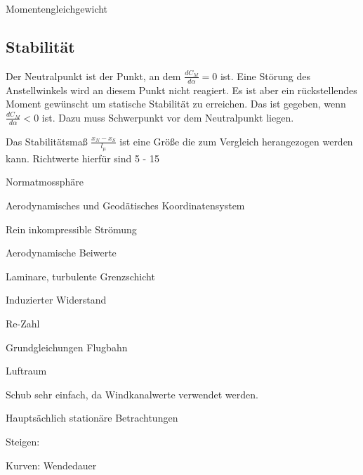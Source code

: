 Momentengleichgewicht

\subsection{Stabilität}
\label{stabilität}

Der Neutralpunkt ist der Punkt, an dem $\frac{dC_M}{d\alpha} = 0$ ist. Eine Störung des Anstellwinkels wird an diesem Punkt nicht reagiert. Es ist aber ein rückstellendes Moment gewünscht um statische Stabilität zu erreichen. Das ist gegeben, wenn $\frac{dC_M}{d\alpha} < 0$ ist. Dazu muss Schwerpunkt vor dem Neutralpunkt liegen.

Das Stabilitätsmaß $\frac{x_N - x_S}{l_\mu}$ ist eine Größe die zum Vergleich herangezogen werden kann. Richtwerte hierfür sind 5 - 15%




\newpage
Normatmossphäre

Aerodynamisches und Geodätisches Koordinatensystem

Rein inkompressible Strömung

Aerodynamische Beiwerte

Laminare, turbulente Grenzschicht

Induzierter Widerstand

Re-Zahl

Grundgleichungen Flugbahn

Luftraum

Schub sehr einfach, da Windkanalwerte verwendet werden.

Hauptsächlich stationäre Betrachtungen

Steigen:

Kurven: Wendedauer

